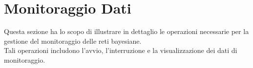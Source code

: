 \section{Monitoraggio Dati}\label{Monitoraggio}
Questa sezione ha lo scopo di illustrare in dettaglio le operazioni necessarie per la gestione del monitoraggio delle reti bayesiane.\\
Tali operazioni includono l'avvio, l'interruzione e la visualizzazione dei dati di monitoraggio.



\pagebreak





\pagebreak



\pagebreak



\pagebreak


